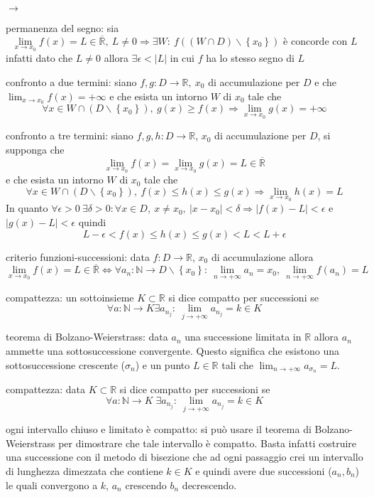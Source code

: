 \documentclass[12pt,a4paper]{article}
\newcommand*{\ep}{\epsilon}
\newcommand{\fr}{$f: D \to \mathbb{R} $}
\newcommand{\li}{\forall \ep > 0 \: \exists \delta > 0 : \forall x \in D, \: x \neq x_0, \: \left\lvert x - x_0\right\rvert < \delta \Rightarrow \left\lvert f(x) - L\right\rvert < \ep}
\begin{document}
\begin{list}{$\rightarrow$}{}
    \item permanenza del segno: sia \[\lim_{x \to x_0} f(x) = L \in \overline{\mathbb{R}}, \: L \neq 0 \Rightarrow \exists W : \: f((W \cap D) \smallsetminus \left\{x_0\right\}) \text{ è concorde con } L\] infatti dato che $L \neq 0 $ allora $\exists \ep < \left\lvert L\right\rvert $ in cui $f$ ha lo stesso segno di $L$
    \item confronto a due termini: siano $f, g: D \to \mathbb{R}, \: x_0$ di accumulazione per $D$ e che $\lim_{x \to x_0} f(x) = +\infty$ e che esista un intorno $W$ di $x_0$ tale che \[ \forall x \in W \cap (D \smallsetminus \left\{x_0\right\} ), \: g(x) \ge f(x) \Rightarrow \lim_{x \to x_0} g(x) = +\infty\] 
    \item confronto a tre termini: siano $f, g, h: D \to \mathbb{R} $, $x_0$ di accumulazione per $D$, si supponga che \[\lim_{x \to x_0} f(x) = \lim_{x \to x_0} g(x) = L \in \overline{\mathbb{R} }\] e che esista un intorno $W$ di $x_0$ tale che \[\forall x \in W \cap (D \smallsetminus \left\{x_0\right\} ), \: f(x) \le h(x) \le g(x) \Rightarrow \lim_{x \to x_0} h(x) = L\] In quanto $\li{}$ e $\left\lvert g(x) - L\right\rvert < \ep$ quindi \[L - \ep < f(x) \le h(x) \le g(x) < L < L + \ep\]
    \item criterio funzioni-successioni: data \fr{}, $x_0$ di accumulazione allora \[\lim_{x \to x_0} f(x) = L \in \overline{\mathbb{R}} \Leftrightarrow \forall a_n: \mathbb{N} \to D \smallsetminus \left\{x_0\right\}  : \: \lim_{n \to +\infty} a_n = x_0, \: \lim_{n \to +\infty} f(a_n) = L\]
    \item compattezza: un sottoinsieme $K \subset \mathbb{R}$ si dice compatto per successioni se \[\forall a: \mathbb{N} \to K \exists a_{n_j}: \: \lim_{j \to +\infty} a_{n_j} = k \in K\]
    \item teorema di Bolzano-Weierstrass: data $a_n$ una successione limitata in $\mathbb{R}$ allora $a_n$ ammette una sottosuccessione convergente. Questo significa che esistono una sottosuccessione crescente ($\sigma_n$) e un punto $L \in \mathbb{R}$ tali che $\lim_{n \to +\infty} a_{\sigma_n} = L$.
    \item compattezza: data $ K \subset \mathbb{R} $ si dice compatto per successioni se \[\forall a: \mathbb{N} \to K \; \exists a_{n_j} : \: \lim_{j \to + \infty} a _{n_j} = k \in K\] 
    \item ogni intervallo chiuso e limitato è compatto: si può usare il teorema di Bolzano-Weierstrass per dimostrare che tale intervallo è compatto. Basta infatti costruire una successione con il metodo di bisezione che ad ogni passaggio crei un intervallo di lunghezza dimezzata che contiene $k \in K$ e quindi avere due successioni ($a_n, b_n$) le quali convergono a $k$, $a_n$ crescendo $b_n$ decrescendo. 
\end{list}
\end{document}
